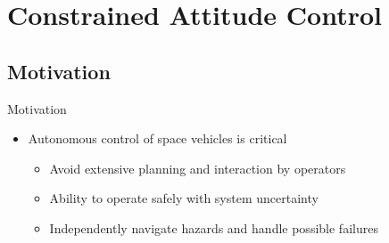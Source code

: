


\section{Constrained Attitude Control}
\subsection{Motivation}

\begin{frame}[t]{Motivation} %
\begin{itemize}
    \item Autonomous control of space vehicles is critical
    \begin{itemize}
        \item Avoid extensive planning and interaction by operators
        \item Ability to operate safely with system uncertainty 
        \item Independently navigate hazards and handle possible failures
    \end{itemize}
\end{itemize}
\end{frame}
